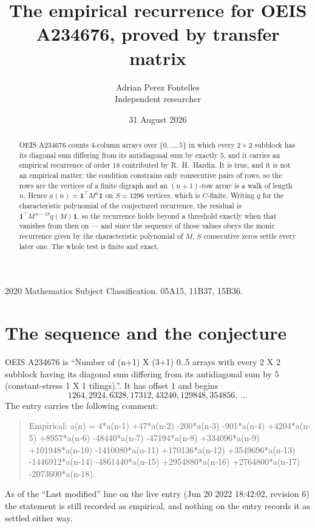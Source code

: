 \documentclass[11pt,a4paper]{article}
\title{The empirical recurrence for OEIS A234676, proved by transfer matrix}
\author{Adrian Perez Fontelles\\ \small Independent researcher}
\date{31 August 2026}
\theoremstyle{plain}
\theoremstyle{definition}
\begin{document}
\maketitle

\begin{abstract}
OEIS A234676 counts $4$-column arrays over $\{0,\dots,5\}$ in which every
$2\times2$ subblock has its diagonal sum differing from its antidiagonal sum by
exactly $5$, and it
carries an empirical recurrence of order $18$ contributed by R.~H.~Hardin. It is true,
and it is not an empirical matter: the condition constrains only consecutive pairs of rows,
so the rows are the vertices of a finite digraph and an $(n+1)$-row array is a walk of
length $n$. Hence $a(n)=\mathbf{1}^{\!\top}M^{n}\mathbf{1}$ on $S=1296$ vertices, which
is $C$-finite. Writing $q$ for the characteristic polynomial of the conjectured recurrence,
the residual is $\mathbf{1}^{\!\top}M^{\,n-18}q(M)\mathbf{1}$, so the recurrence
holds beyond a threshold exactly when that vanishes from then on --- and since the sequence
of those values obeys the monic recurrence given by the characteristic polynomial of $M$,
$S$ consecutive zeros settle every later one. The whole test is finite and exact.
\end{abstract}

\noindent\small 2020 Mathematics Subject Classification. 05A15, 11B37, 15B36.\normalsize

\section{The sequence and the conjecture}

OEIS A234676 is ``Number of (n+1) X (3+1) 0..5 arrays with every 2 X 2 subblock having its diagonal sum differing from its antidiagonal sum by 5 (constant-stress 1 X 1 tilings).''. It has offset
$1$ and begins
\[
1264, 2924, 6328, 17312, 43240, 129848, 354856,\ \dots
\]
The entry carries the following comment:
\begin{quote}\small
Empirical: a(n) = 4*a(n-1) +47*a(n-2) -200*a(n-3) -901*a(n-4) +4204*a(n-5) +8957*a(n-6) -48440*a(n-7) -47194*a(n-8) +334096*a(n-9) +101948*a(n-10) -1410080*a(n-11) +170136*a(n-12) +3549696*a(n-13) -1446912*a(n-14) -4861440*a(n-15) +2954880*a(n-16) +2764800*a(n-17) -2073600*a(n-18).
\end{quote}
As of the ``Last modified'' line on the live entry (Jun 20 2022 18:42:02, revision 6) the statement is
still recorded as empirical, and nothing on the entry records it as settled either way.
\end{document}
